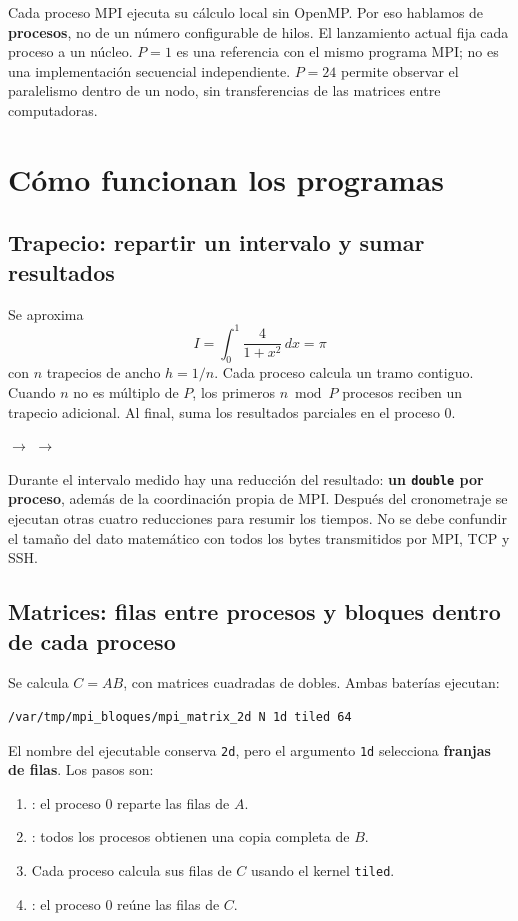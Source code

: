 Cada proceso MPI ejecuta su cálculo local sin OpenMP. Por eso hablamos de \textbf{procesos}, no de un número configurable de hilos. El lanzamiento actual fija cada proceso a un núcleo. $P=1$ es una referencia con el mismo programa MPI; no es una implementación secuencial independiente. $P=24$ permite observar el paralelismo dentro de un nodo, sin transferencias de las matrices entre computadoras.

\section{Cómo funcionan los programas}

\subsection{Trapecio: repartir un intervalo y sumar resultados}
Se aproxima
\[
 I=\int_0^1\frac{4}{1+x^2}\,dx=\pi
\]
con $n$ trapecios de ancho $h=1/n$. Cada proceso calcula un tramo contiguo. Cuando $n$ no es múltiplo de $P$, los primeros $n\bmod P$ procesos reciben un trapecio adicional. Al final,  suma los resultados parciales en el proceso 0.

\begin{center}
\quad$\longrightarrow$\quad
{}\quad$\longrightarrow$\quad
{}
\end{center}

Durante el intervalo medido hay una reducción del resultado: \textbf{un \texttt{double} por proceso}, además de la coordinación propia de MPI. Después del cronometraje se ejecutan otras cuatro reducciones para resumir los tiempos. No se debe confundir el tamaño del dato matemático con todos los bytes transmitidos por MPI, TCP y SSH.

\subsection{Matrices: filas entre procesos y bloques dentro de cada proceso}
Se calcula $C=A B$, con matrices cuadradas de dobles. Ambas baterías ejecutan:
\begin{lstlisting}[language=bash]
/var/tmp/mpi_bloques/mpi_matrix_2d N 1d tiled 64
\end{lstlisting}
El nombre del ejecutable conserva \texttt{2d}, pero el argumento \texttt{1d} selecciona \textbf{franjas de filas}. Los pasos son:
\begin{enumerate}
\item {}: el proceso 0 reparte las filas de $A$.
\item {}: todos los procesos obtienen una copia completa de $B$.
\item Cada proceso calcula sus filas de $C$ usando el kernel \texttt{tiled}.
\item {}: el proceso 0 reúne las filas de $C$.
\end{enumerate}

